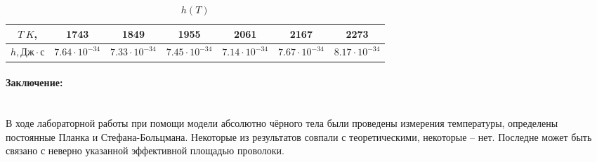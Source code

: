 \documentclass[a4paper, 12pt]{article}
\newcommand{\parag}[1]{\paragraph*{#1:}}
\begin{document}
\begin{table}[H]
    \centering
    \begin{tabular}{|c|c|c|c|c|c|c|}
        \hline
        $T~K$,   &  1743	 & 1849	 & 1955	 & 2061	 & 2167	 & 2273	\\ \hline
        $h, Дж \cdot с$ & $7.64 \cdot 10^{-34}$	 & $7.33 \cdot 10^{-34}$	 & $7.45 \cdot 10^{-34}$	 & $7.14 \cdot 10^{-34}$	 & $7.67 \cdot 10^{-34}$	 & $8.17 \cdot 10^{-34}$	\\ \hline
    \end{tabular}
    \caption {$h (T)$}
    \label{tab:h}
\end{table}

\parag {Заключение} ~\\
В ходе лабораторной работы при помощи модели абсолютно чёрного тела были проведены измерения температуры, определены постоянные Планка и Стефана-Больцмана. Некоторые из результатов совпали с теоретическими, некоторые -- нет. Последне может быть связано с неверно указанной эффективной площадью проволоки. 
\end{document}
